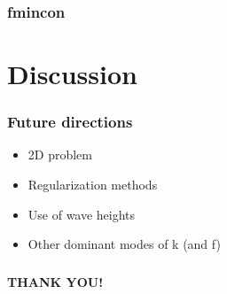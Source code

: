 \documentclass[7pt]{beamer}
\begin{document}
 \begin{frame}
\frametitle{fmincon}


\end{frame}




\section{Discussion}
\begin{frame}
 \frametitle{Future directions}
 \begin{itemize}
 \item 2D problem
 \item Regularization methods
 \item Use of wave heights
 \item Other dominant modes of k (and f)
 \end{itemize}

\end{frame}
\begin{frame}
\frametitle{}
\hspace{2.5cm}
\begin{minipage}{50mm}   
                                                                                                                           
      \begin{alertblock}{}    
                                          
            \begin{center}
                                                                                                                                                                                  
                  \textbf{THANK YOU!}
                            
                                                                       
            \end{center}
      \end{alertblock}
\end{minipage}
\end{frame}
\end{document}
